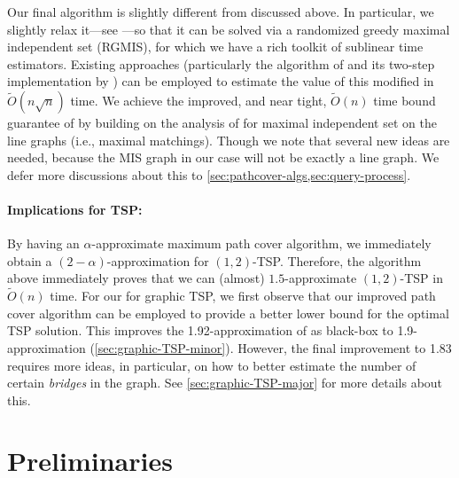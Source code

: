 Our final algorithm is slightly different from \algone{} discussed above. In particular, we slightly relax it---see \algtwo{}---so that it can be solved via a randomized greedy maximal independent set (RGMIS), for which we have a rich toolkit of sublinear time estimators. Existing approaches (particularly the algorithm of \citet*{YoshidaYI09} and its two-step implementation by \citet*{chen2020}) can be employed to estimate the value of this modified \algtwo{} in $\widetilde{O}(n\sqrt{n})$ time. We achieve the improved, and near tight, $\widetilde{O}(n)$ time bound guarantee of  by building on the analysis of \citet*{behnezhad2021} for maximal independent set on the line graphs (i.e., maximal matchings). Though we note that several new ideas are needed, because the MIS graph in our case will not be exactly a line graph. We defer more discussions about this to \cref{sec:pathcover-algs,sec:query-process}. 

\paragraph{Implications for TSP:} By having an $\alpha$-approximate maximum path cover algorithm, we immediately obtain a $(2-\alpha)$-approximation for $(1,2)$-TSP. Therefore, the algorithm above immediately proves  that we can (almost) $1.5$-approximate $(1,2)$-TSP in $\widetilde{O}(n)$ time. For our  for graphic TSP, we first observe that our improved path cover algorithm can be employed to provide a better lower bound for the optimal TSP solution. This improves the 1.92-approximation of \cite{chen2020} as black-box to 1.9-approximation (\cref{sec:graphic-TSP-minor}). However, the final improvement to 1.83 requires more ideas, in particular, on how to better estimate the number of certain {\em bridges} in the graph. See \cref{sec:graphic-TSP-major} for more details about this.



\section{Preliminaries}

